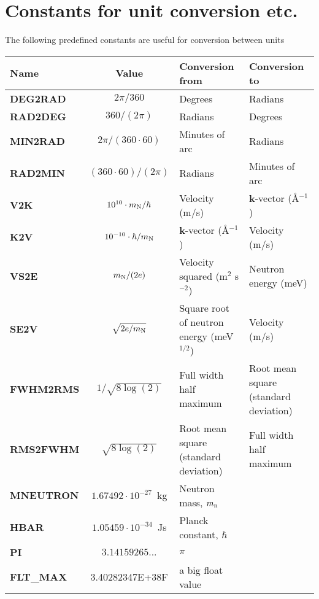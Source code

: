 \section{Constants for unit conversion etc.}
The following predefined constants are useful for conversion
between units
\def\textvb{\textbf}
\begin{center}
\begin{tabular}{|l|c|p{}|p{}|}
\hline
Name & Value & Conversion from & Conversion to \\ \hline
\textvb{DEG2RAD} & $2 \pi / 360$ & Degrees & Radians \\
\textvb{RAD2DEG} & $360 / (2 \pi)$ & Radians & Degrees \\
\textvb{MIN2RAD} & $2 \pi / (360 \cdot 60)$
  & Minutes of arc & Radians \\
\textvb{RAD2MIN} & $(360\cdot 60) / (2 \pi)$
  & Radians & Minutes of arc \\
\textvb{V2K} & $10^{10} \cdot m_{\rm N}/\hbar$
  & Velocity (m/s) & {\bf k}-vector (\AA$^{-1}$) \\
\textvb{K2V} & $10^{-10} \cdot \hbar / m_{\rm N}$
  & {\bf k}-vector (\AA$^{-1}$) & Velocity (m/s) \\
\textvb{VS2E} & $m_{\rm N} / (2 e)$
  & Velocity squared (m$^2$ s$^{-2}$) & Neutron energy (meV) \\
\textvb{SE2V} & $\sqrt{2 e/m_{\rm N}}$
  & Square root of neutron energy (meV$^{1/2}$) & Velocity (m/s) \\
\textvb{FWHM2RMS} & $1/\sqrt{8\log(2)}$
  & Full width half maximum & Root mean square (standard deviation) \\
\textvb{RMS2FWHM} & $\sqrt{8\log(2)}$
  & Root mean square (standard deviation) & Full width half maximum \\
\textvb{MNEUTRON} & $1.67492 \cdot 10^{-27}$~kg
  & Neutron mass, $m_{\rm n}$ & \\
\textvb{HBAR} & $1.05459 \cdot 10^{-34}$~Js
  & Planck constant, $\hbar$ & \\
\textvb{PI} & $3.14159265...$
  & $\pi$ & \\
\textvb{FLT\_MAX} & 3.40282347E+38F
  & a big float value & \\
\hline
\end{tabular}
\end{center}

